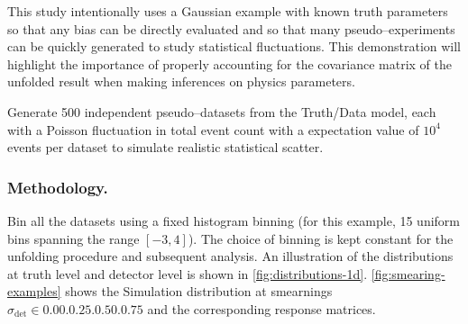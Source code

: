         This study intentionally uses a Gaussian example with known truth parameters so that any bias can be directly evaluated and so that many pseudo--experiments can be quickly generated to study statistical fluctuations.
        This demonstration will highlight the importance of properly accounting for the covariance matrix of the unfolded result when making inferences on physics parameters.
        
        Generate 500 independent pseudo--datasets from the Truth/Data model, each with a Poisson fluctuation in total event count with a expectation value of $10^4$ events per dataset to simulate realistic statistical scatter.
        
        \subsubsection{Methodology.}
        \label{subsec:methodology}
            Bin all the datasets using a fixed histogram binning (for this example, 15 uniform bins spanning the range $[-3,4]$).
            The choice of binning is kept constant for the unfolding procedure and subsequent analysis.
            An illustration of the distributions at truth level and detector level is shown in \cref{fig:distributions-1d}.
            \cref{fig:smearing-examples} shows the Simulation distribution at smearnings \(\sigma_{\text{det}}\in \qty{0.00, 0.25, 0.50, 0.75}\) and the corresponding response matrices.
